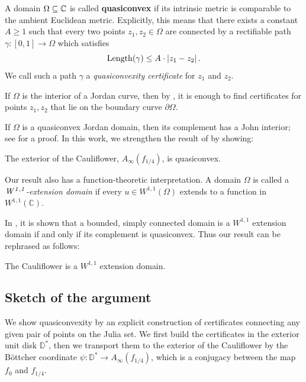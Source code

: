 A domain $\Omega\subseteq\mathbb{C}$ is called \textbf{quasiconvex} if its intrinsic metric is comparable to the ambient Euclidean metric. Explicitly, this means that there exists a constant $A\geq1$ such that every two points $z_{1},z_{2}\in\Omega$ are connected by a rectifiable path $\gamma:\left[0,1\right]\to\Omega$ which satisfies
$$
\operatorname{Length}(\gamma)\leq A\cdot\left|z_{1}-z_{2}\right|.
$$
We call such a path $\gamma$ a \emph{quasiconvexity certificate} for $z_{1}$ and $z_{2}$.

If $\Omega$ is the interior of a Jordan curve, then by \cite[Corollary F]{hakobyan_euclidean_2008},
it is enough to find certificates for points $z_{1},z_{2}$ that lie
on the boundary curve $\partial\Omega$.

If $\Omega$ is a quasiconvex Jordan domain, then its complement has a John interior; see \cite[Corollary 3.4]{hakobyan_euclidean_2008} for a proof.
In this work, we strengthen the result of \cite[Theorem 6.1]{carleson_julia_1994} by showing:

\begin{theorem}
The exterior of the Cauliflower, $A_\infty(f_{1/4})$, is quasiconvex.
\end{theorem}




Our result also has a function-theoretic interpretation.
A domain $\Omega$ is called a \emph{$\it{W^{1,1}}$-extension domain} if every $u \in W^{1,1}(\Omega)$ extends to a function
in $W^{1,1}(\mathbb{C})$.

In \cite[Equation (1.1) and Theorem 1.4]{strong_bv_extension_2022}, 
it is shown that a bounded, simply connected domain
is a $W^{1,1}$ extension domain if and only if its complement is quasiconvex.
Thus our result can be rephrased as follows:


 \begin{theorem}
 The Cauliflower is a $W^{1,1}$ extension domain.
 \end{theorem}
 
\subsection{Sketch of the argument}
We show quasiconvexity by an explicit construction of certificates connecting any given pair of points on the Julia set.
We first build the certificates in the exterior unit disk $\mathbb D ^*$, 
then we transport them to the exterior of the Cauliflower by the Böttcher coordinate $\psi: \mathbb D ^* \to A_\infty(f_{1 / 4})$, which is a conjugacy between the map $f_0$ and $f_{1/4}$.

